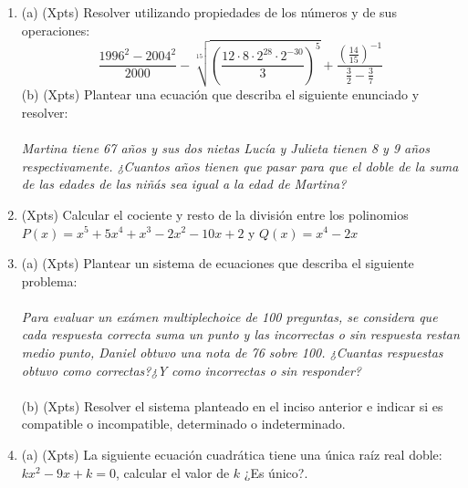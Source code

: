 \documentclass[a4paper]{article}
\begin{document}
\begin{enumerate}
        \item (a) (Xpts) Resolver utilizando propiedades de los números y de sus operaciones:
        \begin{equation*}
                \frac{1996^2-2004^2}{2000}-\sqrt[15]{\left(\frac{12\cdot 8\cdot 2^{28} \cdot 2^{-30}}{3}\right)^5} + \frac{\left(\frac{14}{15}\right)^{-1}}{\frac{3}{2}-\frac{3}{7}}
        \end{equation*}
        (b) (Xpts) Plantear una ecuación que describa el siguiente enunciado y resolver:\\\\
         \textit{Martina tiene 67 años y sus dos nietas Lucía y Julieta tienen 8 y 9 años respectivamente. ¿Cuantos años tienen que pasar para que el doble de la suma de las edades de las niñás sea igual a la edad de Martina?}
        \item (Xpts) Calcular el cociente y resto de la división entre los polinomios $P(x)=x^5+5x^4+x^3-2x^2-10x+2$ y $Q(x)=x^4-2x$
        \item (a) (Xpts) Plantear un sistema de ecuaciones que describa el siguiente problema:\\\\
        \textit{Para evaluar un exámen multiplechoice de 100 preguntas, se considera que cada respuesta correcta suma un punto y las incorrectas o sin respuesta restan medio punto, Daniel obtuvo una nota de 76 sobre 100. ¿Cuantas respuestas obtuvo como correctas?¿Y como incorrectas o sin responder?}\\\\
        (b) (Xpts) Resolver el sistema planteado en el inciso anterior e indicar si es compatible o incompatible, determinado o indeterminado.
        \item (a) (Xpts) La siguiente ecuación cuadrática tiene una única raíz real doble: $k x^2 - 9x + k = 0$, calcular el valor de $k$ ¿Es único?.\\\\

\end{enumerate}
\end{document}
